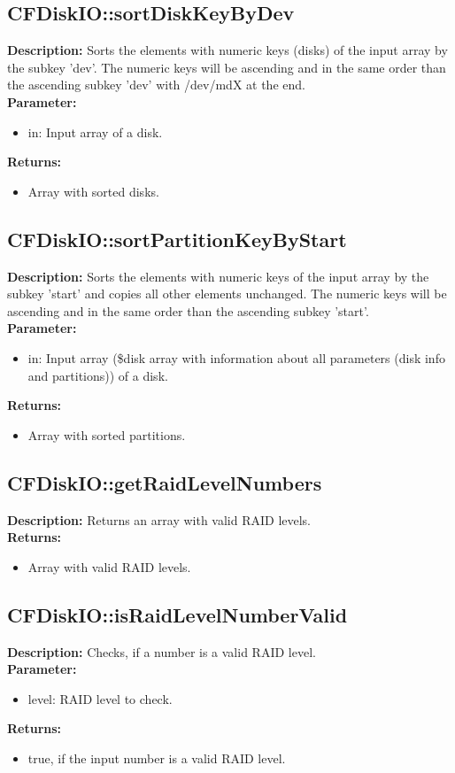 \subsection{CFDiskIO::sortDiskKeyByDev}
\textbf{Description:} Sorts the elements with numeric keys (disks) of the input array by the subkey 'dev'. The numeric keys will be ascending and in the same order than the ascending subkey 'dev' with /dev/mdX at the end.\\
\textbf{Parameter:}
\begin{itemize}
\item in: Input array of a disk.
\end{itemize}
\textbf{Returns:}
\begin{itemize}
\item Array with sorted disks.
\end{itemize}

\subsection{CFDiskIO::sortPartitionKeyByStart}
\textbf{Description:} Sorts the elements with numeric keys of the input array by the subkey 'start' and copies all other elements unchanged. The numeric keys will be ascending and in the same order than the ascending subkey 'start'.\\
\textbf{Parameter:}
\begin{itemize}
\item in: Input array (\$disk array with information about all parameters (disk info and partitions)) of a disk.
\end{itemize}
\textbf{Returns:}
\begin{itemize}
\item Array with sorted partitions.
\end{itemize}

\subsection{CFDiskIO::getRaidLevelNumbers}
\textbf{Description:} Returns an array with valid RAID levels.\\
\textbf{Returns:}
\begin{itemize}
\item Array with valid RAID levels.
\end{itemize}

\subsection{CFDiskIO::isRaidLevelNumberValid}
\textbf{Description:} Checks, if a number is a valid RAID level.\\
\textbf{Parameter:}
\begin{itemize}
\item level: RAID level to check.
\end{itemize}
\textbf{Returns:}
\begin{itemize}
\item true, if the input number is a valid RAID level.
\end{itemize}


